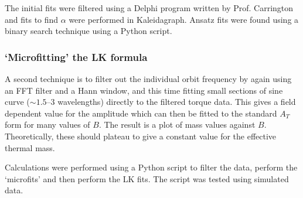 The initial fits were filtered using a Delphi program written by Prof. Carrington and fits to find $\alpha$ were performed in Kaleidagraph. Ansatz fits were found using a binary search technique using a Python script.


\subsubsection{`Microfitting' the \ac{LK} formula}
\label{Sec:Exp:LKMicrofitting}

A second technique is to filter out the individual orbit frequency by again using an \ac{FFT} filter and a Hann window, and this time fitting small sections of sine curve ($\sim 1.5$--$3$ wavelengths) directly to the filtered torque data. This gives a field dependent value for the amplitude which can then be fitted to the standard $A_T$ form for many values of $B$. The result is a plot of mass values against $B$. Theoretically, these should plateau to give a constant value for the effective thermal mass.

Calculations were performed using a Python script to filter the data, perform the `microfits' and then perform the \ac{LK} fits. The script was tested using simulated data.


